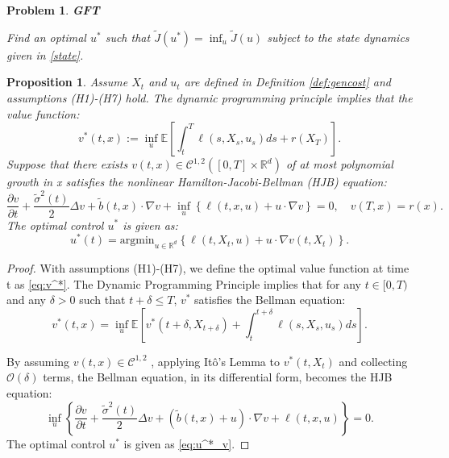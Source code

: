 \documentclass[11pt]{article}
\newtheorem{problem}{Problem}[section]
\newtheorem{proposition}{Proposition}[section]
\def\w{\widetilde}
\begin{document}
\begin{problem}
\textbf{GFT} 
\label{prob:GFT}

Find an optimal $u^*$ such that 
$\widetilde{J}(u^*) = \inf_{u}\widetilde{J}(u)$ subject to the state dynamics given in \eqref{state}.    
\end{problem}




\begin{proposition}
\label{pro-hjb-ell}
Assume $X_t$ and $u_t$ are defined in Definition \ref{def:gencost} and assumptions  (H1)-(H7) hold. The dynamic programming principle implies that the value function:
\begin{equation}
\label{eq:v^*}
v^*(t,x) := \inf_{u} \mathbb{E}\left[ \int_t^T \ell(s, X_s, u_s)ds + r(X_T) \right].
\end{equation}
Suppose that there exists $v(t,x) \in \mathcal{C}^{1,2}([0,T]\times\mathbb{R}^d)$ of at most polynomial growth in x satisfies the nonlinear Hamilton-Jacobi-Bellman (HJB) equation:
\begin{equation}
\label{eq:hjb-ell}
    \frac{\partial v}{\partial t} + \frac{\w{\sigma}^2(t)}{2} \Delta v +\w{b} (t,x) \cdot \nabla v + \inf_{u } \left\{ \ell(t,x,u) + u \cdot \nabla v \right\} = 0, \quad v(T,x) = r(x).
\end{equation}
The optimal control $u^*$ is given as:
\begin{equation}
\label{eq:u^*_v}
u^*(t) = \mathrm{argmin}_{u\in\mathbb{R}^d} \left\{ \ell(t,X_t,u) + u \cdot \nabla v(t, X_t) \right\} .   
\end{equation}

\end{proposition}
\begin{proof}
With assumptions (H1)-(H7), we define the optimal value function at time t as \ref{eq:v^*}.
The Dynamic Programming Principle implies that for any $t \in [0, T)$ and any $\delta  > 0$ such that $t + \delta  \le T$, $v^*$ satisfies the Bellman equation:
\begin{equation}
\label{eq:Bellman_equation}
v^*(t, x) = \inf_{u} \mathbb{E}\left[  v^*(t+\delta , X_{t+\delta })+\int_t^{t+\delta } \ell(s, X_s, u_s)ds  \right].
\end{equation}

By assuming $v(t,x) \in \mathcal{C}^{1,2}$ , applying Itô's Lemma to $v^*(t, X_t)$ and collecting $\mathcal{O}(\delta)$ terms, the Bellman equation, in its differential form, becomes the HJB equation:$$\inf_{u} \left\{\frac{\partial v}{\partial t} + \frac{\w{\sigma}^2(t)}{2} \Delta v + (\w{b}(t,x) + u) \cdot \nabla v   + \ell(t,x,u) \right\} = 0.$$
The optimal control $u^*$ is  given as \eqref{eq:u^*_v}.
\end{proof}
\end{document}
